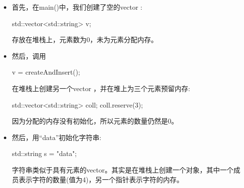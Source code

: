 \begin{itemize}
	\item 首先，在main()中，我们创建了空的vector :
\begin{cppcode}
std::vector<std::string> v;
\end{cppcode}
	存放在堆栈上，元素数为0，未为元素分配内存。
	\item 然后，调用
\begin{cppcode}
v = createAndInsert();
\end{cppcode}
	在堆栈上创建另一个vector ，并在堆上为三个元素预留内存:
\begin{cppcode}
std::vector<std::string> coll;
coll.reserve(3);
\end{cppcode}
	因为分配的内存没有初始化，所以元素的数量仍然是0。
	\item 然后，用“data”初始化字符串:
\begin{cppcode}
std::string s = "data";
\end{cppcode}
	字符串类似于具有元素的vector。其实是在堆栈上创建一个对象，其中一个成员表示字符的数量(值为4)，另一个指针表示字符的内存。


\end{itemize}
